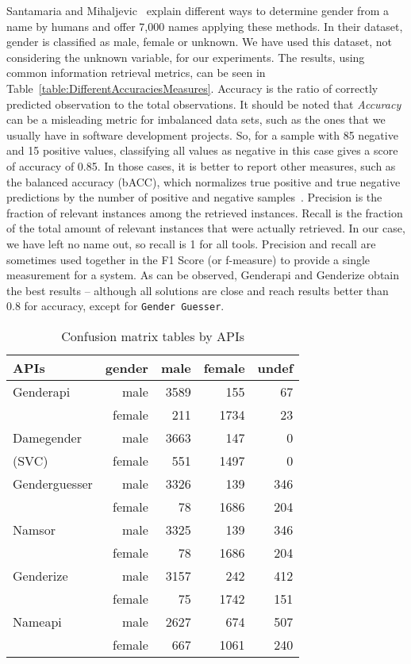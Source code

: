 \documentclass[a4paper]{article}
\begin{document}
Santamaria and Mihaljevic~\cite{10.7717/peerj-cs.156} explain different ways to determine gender from a name by humans and offer 7,000 names applying these methods. 
In their dataset, gender is classified as male, female or unknown. 
We have used this dataset, not considering the unknown variable, for our experiments.
The results, using common information retrieval metrics, can be seen in Table~\ref{table:DifferentAccuraciesMeasures}.
Accuracy is the ratio of correctly predicted observation to the total observations.
It should be noted that \emph{Accuracy} can be a misleading metric for imbalanced data sets, such as the ones that we usually have in software development projects.
So, for a sample with 85 negative and 15 positive values, classifying all values as negative in this case gives a score of accuracy of 0.85.
In those cases, it is better to report other measures, such as the balanced accuracy (bACC), which normalizes true positive and true negative predictions by the number of positive and negative samples~\cite{mower2005prep}.
Precision is the fraction of relevant instances among the retrieved instances.
Recall is the fraction of the total amount of relevant instances that were actually retrieved.
In our case, we have left no name out, so recall is 1 for all tools.
Precision and recall are sometimes used together in the F1 Score (or f-measure) to provide a single measurement for a system.
As can be observed, Genderapi and Genderize obtain the best results -- although all solutions are close and reach results better than 0.8 for accuracy, except for \texttt{Gender Guesser}.




\begin{table}[t]
\footnotesize
\begin{tabular}[]{lrrrr}
  \hline
  APIs          & gender & male & female & undef \tabularnewline
\hline
Genderapi         & male    & 3589 & 155  &  67 \tabularnewline
                  & female  & 211  & 1734 &  23 \tabularnewline
Damegender       & male    & 3663 & 147  &   0 \tabularnewline
(SVC)\footnotemark[1] & female  & 551  & 1497 &   0 \tabularnewline
Genderguesser     & male    & 3326 &  139 & 346 \tabularnewline
                  & female  & 78   & 1686 & 204 \tabularnewline
Namsor            & male    & 3325 & 139  & 346 \tabularnewline
                  & female  & 78   & 1686 & 204 \tabularnewline
Genderize         & male    & 3157 & 242  & 412 \tabularnewline
                  & female  & 75   & 1742 & 151 \tabularnewline
Nameapi           & male    & 2627 & 674  & 507 \tabularnewline
                  & female  & 667  & 1061 & 240 \tabularnewline 
\hline
\end{tabular}
\caption{Confusion matrix tables by APIs}
\label{table:ConfusionMatrixTables}
\end{table}
\end{document}
